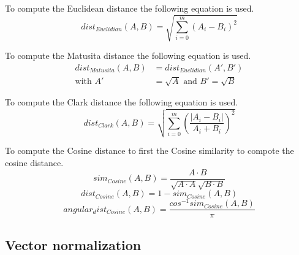 \begin{definition}
  To compute the Euclidean distance the following equation is used.
  \begin{equation}
    dist_{Euclidian}(A, B) = \sqrt{\sum_{i=0}^{m}(A_i - B_i)^2}
  \end{equation}
\end{definition}

\begin{definition}
  To compute the Matusita distance the following equation is used.
  \begin{equation}
    \begin{split}
      dist_{Matusita}(A, B) &= dist_{Euclidian}(A', B') \\
      \text{with }A' &= \sqrt{A}\text{ and }B' = \sqrt{B}
    \end{split}
  \end{equation}
\end{definition}

\begin{definition}
  To compute the Clark distance the following equation is used.
  \begin{equation}
    dist_{Clark}(A, B) = \sqrt{\sum_{i=0}^{m}\left(\frac{|A_i - B_i|}{A_i + B_i}\right)^2}
  \end{equation}
\end{definition}

\begin{definition}
  To compute the Cosine distance to first the Cosine similarity to compote the cosine distance.
  \begin{equation}
    sim_{Cosine}(A, B) = \frac{A \cdot B}{\sqrt{A \cdot A}\sqrt{B \cdot B}}
  \end{equation}
  \begin{equation}
    dist_{Cosine}(A, B) = 1 - sim_{Cosine}(A, B)
  \end{equation}
  \begin{equation}
    angular_dist_{Cosine}(A, B) = \frac{cos^{-1}sim_{Cosine}(A, B)}{\pi}
  \end{equation}
\end{definition}

\subsection{Vector normalization}

